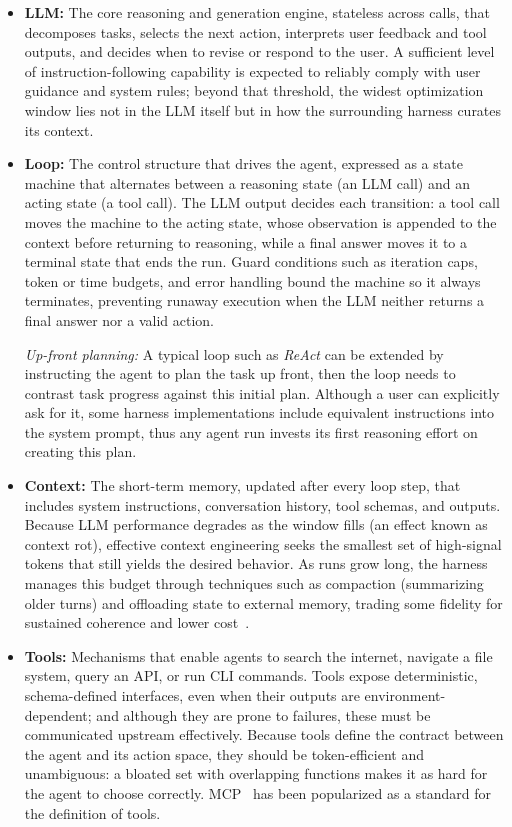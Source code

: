 \documentclass{article}
\begin{document}
\begin{itemize}
    \item \textbf{LLM:} The core reasoning and generation engine, stateless across calls, that decomposes tasks, selects the next action, interprets user feedback and tool outputs, and decides when to revise or respond to the user. A sufficient level of instruction-following capability is expected to reliably comply with user guidance and system rules; beyond that threshold, the widest optimization window lies not in the LLM itself but in how the surrounding harness curates its context.
    
    \item \textbf{Loop:} The control structure that drives the agent, expressed as a state machine that alternates between a reasoning state (an LLM call) and an acting state (a tool call). The LLM output decides each transition: a tool call moves the machine to the acting state, whose observation is appended to the context before returning to reasoning, while a final answer moves it to a terminal state that ends the run. Guard conditions such as iteration caps, token or time budgets, and error handling bound the machine so it always terminates, preventing runaway execution when the LLM neither returns a final answer nor a valid action.
    
    \textit{Up-front planning:} A typical loop such as \textit{ReAct} can be extended by instructing the agent to plan the task up front, then the loop needs to contrast task progress against this initial plan. Although a user can explicitly ask for it, some harness implementations include equivalent instructions into the system prompt, thus any agent run invests its first reasoning effort on creating this plan. 
      
    \item \textbf{Context:} The short-term memory, updated after every loop step, that includes system instructions, conversation history, tool schemas, and outputs. Because LLM performance degrades as the window fills (an effect known as context rot), effective context engineering seeks the smallest set of high-signal tokens that still yields the desired behavior. As runs grow long, the harness manages this budget through techniques such as compaction (summarizing older turns) and offloading state to external memory, trading some fidelity for sustained coherence and lower cost~\cite{context-engineering}.
    
    \item \textbf{Tools:} Mechanisms that enable agents to search the internet, navigate a file system, query an API, or run CLI commands. Tools expose deterministic, schema-defined interfaces, even when their outputs are environment-dependent; and although they are prone to failures, these must be communicated upstream effectively. Because tools define the contract between the agent and its action space, they should be token-efficient and unambiguous: a bloated set with overlapping functions makes it as hard for the agent to choose correctly. MCP~\cite{mcp} has been popularized as a standard for the definition of tools.
    

\end{itemize}
\end{document}
